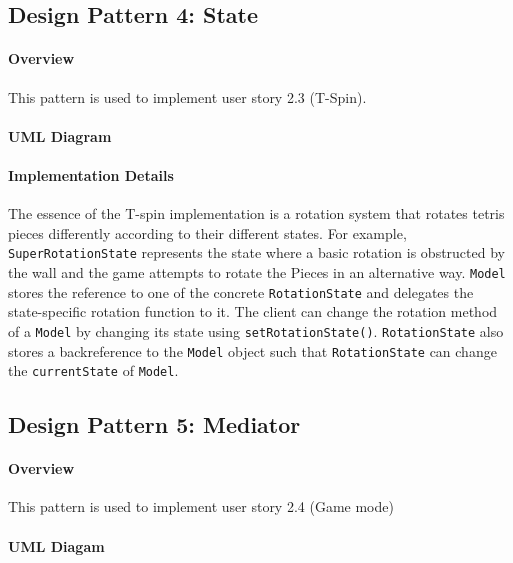\documentclass{article}
\begin{document}
\clearpage

\subsection{Design Pattern 4: State}

\paragraph{Overview}
This pattern is used to implement user story 2.3 (T-Spin).

\paragraph{UML Diagram}\hfill

\begin{figure}[H]
    
\end{figure}

\paragraph{Implementation Details}

The essence of the T-spin implementation is a rotation system that rotates tetris pieces differently according to their different states. For example, \verb`SuperRotationState` represents the state where a basic rotation is obstructed by the wall and the game attempts to rotate the Pieces in an alternative way. \verb`Model` stores the reference to one of the concrete \verb`RotationState` and delegates the state-specific rotation function to it. The client can change the rotation method of a \verb|Model| by changing its state using \verb`setRotationState()`. \verb`RotationState` also stores a backreference to the \verb`Model` object such that \verb`RotationState` can change the \verb`currentState` of \verb`Model`.

\clearpage

\subsection{Design Pattern 5: Mediator}

\paragraph{Overview}
This pattern is used to implement user story 2.4 (Game mode)

\paragraph{UML Diagam}\hfill
\end{document}
